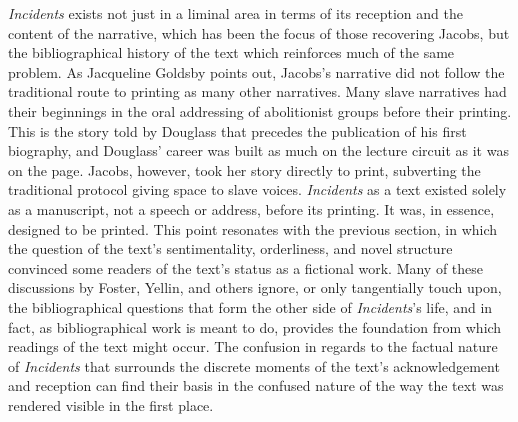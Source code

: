 \textit{Incidents} exists not just in a liminal area in terms of its reception and the content of the narrative, which has been the focus of those recovering Jacobs, but the bibliographical history of the text which reinforces much of the same problem. As Jacqueline Goldsby points out, Jacobs's narrative did not follow the traditional route to printing as many other narratives. Many slave narratives had their beginnings in the oral addressing of abolitionist groups before their printing. This is the story told by Douglass that precedes the publication of his first biography, and Douglass' career was built as much on the lecture circuit as it was on the page. Jacobs, however, took her story directly to print, subverting the traditional protocol giving space to slave voices. \textit{Incidents} as a text existed solely as a manuscript, not a speech or address, before its printing. It was, in essence, designed to be printed.\autocite{jacqueline_goldsby_``i_1996} This point resonates with the previous section, in which the question of the text's sentimentality, orderliness, and novel structure convinced some readers of the text's status as a fictional work. Many of these discussions by Foster, Yellin, and others ignore, or only tangentially touch upon, the bibliographical questions that form the other side of \textit{Incidents}'s life, and in fact, as bibliographical work is meant to do, provides the foundation from which readings of the text might occur. The confusion in regards to the factual nature of \textit{Incidents} that surrounds the discrete moments of the text's acknowledgement and reception can find their basis in the confused nature of the way the text was rendered visible in the first place.

